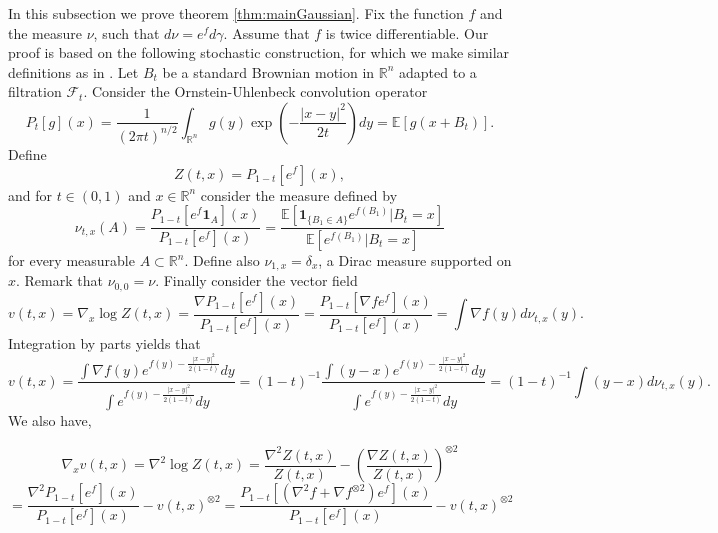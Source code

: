 \documentclass[12pt]{article}
\def \RR {\mathbb R}
\def \EE {\mathbb E}
\def \FF {\mathcal{F}}
\theoremstyle{definition}
\theoremstyle{remark}
\begin{document}
In this subsection we prove theorem \ref{thm:mainGaussian}. Fix the function $f$ and the measure $\nu$, such that $d \nu = e^f d \gamma$. Assume that $f$ is 
twice differentiable. Our proof is based on the following stochastic construction, for which we make similar definitions as in \cite{EL-regularization}. Let $B_t$ be a standard Brownian motion in $\RR^n$ adapted to a filtration $\FF_t$. Consider the Ornstein-Uhlenbeck convolution operator
$$
P_t[g](x) = \frac{1}{(2 \pi t)^{n/2} } \int_{\RR^n} g(y) \exp \left ( - \frac{|x-y|^2}{2t} \right ) dy = \EE[g(x+B_t)].
$$
Define 
$$
Z(t,x) = P_{1-t}[e^f](x),
$$
and for $t \in (0,1)$ and $x \in \RR^n$ consider the measure defined by
$$
\nu_{t,x}(A) = \frac{P_{1-t}[e^f \mathbf{1}_A](x)}{ P_{1-t}[e^f](x)} = \frac{\EE \left [ \mathbf{1}_{\{B_1 \in A\}} e^{f(B_1)} | B_t = x \right ]  }{\EE \left [ e^{f(B_1)} | B_t = x \right ]  }
$$
for every measurable $A \subset \RR^n$. Define also $\nu_{1,x} = \delta_x$, a Dirac measure supported on $x$. Remark that $\nu_{0,0} = \nu$. Finally consider the vector field
$$
v(t,x) = \nabla_x \log Z(t,x) = \frac{\nabla P_{1-t}[e^f](x)}{ P_{1-t}[e^f](x) } = \frac{P_{1-t}[\nabla f e^f ](x)  }{ P_{1-t}[e^f](x) } = \int \nabla f(y) d \nu_{t,x}(y).
$$
Integration by parts yields that
$$
v(t,x) = \frac{ \int \nabla f(y) e^{f(y) - \tfrac{|x-y|^2}{2(1-t)}} dy } { \int e^{f(y) - \tfrac{|x-y|^2}{2(1-t)}} dy} = (1-t)^{-1} \frac{ \int (y-x) e^{f(y) - \tfrac{|x-y|^2}{2(1-t)}} dy } { \int e^{f(y) - \tfrac{|x-y|^2}{2(1-t)}} dy } = (1-t)^{-1} \int (y-x) d \nu_{t,x}(y).
$$
We also have,

$$
\nabla_x v(t,x) = \nabla^2 \log Z(t,x) = \frac{\nabla^2 Z(t,x)}{Z(t,x)} - \left (\frac{\nabla Z(t,x)}{Z(t,x)} \right )^{\otimes 2}
$$
$$
= \frac{\nabla^2 P_{1-t} [e^f](x)  }{ P_{1-t} [e^f](x) } - v(t,x)^{\otimes 2} = \frac{ P_{1-t} [ \left ( \nabla^2 f + \nabla f^{\otimes 2} \right ) e^f](x) } { P_{1-t}[e^f](x)} - v(t,x)^{\otimes 2}
$$
\end{document}
